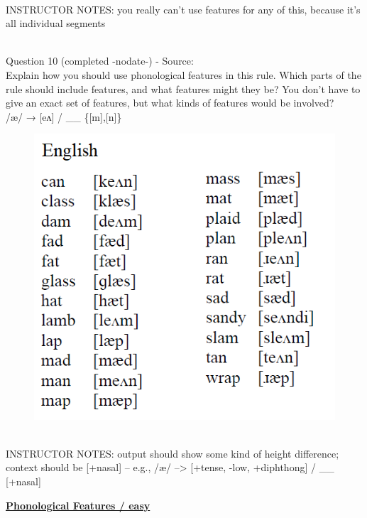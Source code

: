 \documentclass[12pt]{article}
\begin{document}
~\\
INSTRUCTOR NOTES: you really can't use features for any of this, because it's all individual segments


~\\

{\large Question 10} (completed -nodate-) - Source: \\

Explain how you should use phonological features in this rule. Which parts of the rule should include features, and what features might they be? You don't have to give an exact set of features, but what kinds of features would be involved?\\

/æ/ → {[eʌ]} / \_\_ \{{[m]},{[n]}\}

\begin{figure}[H]
\includegraphics{../images/english_aeraising.png}
\end{figure}

~\\
INSTRUCTOR NOTES: output should show some kind of height difference; context should be [+nasal] -- e.g., /æ/ --> [+tense, -low, +diphthong] / \_\_ [+nasal]


\newpage\textbf{\underline{\huge Phonological Features / easy\\}}

~\\
\end{document}
